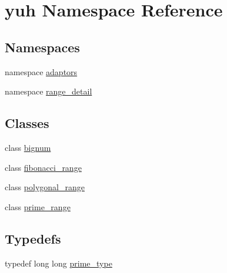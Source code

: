 \hypertarget{namespaceyuh}{\section{yuh \-Namespace \-Reference}
\label{d5/d2b/namespaceyuh}
}
\subsection*{\-Namespaces}
\begin{DoxyCompactItemize}
\item 
namespace \hyperlink{namespaceyuh_1_1adaptors}{adaptors}
\item 
namespace \hyperlink{namespaceyuh_1_1range__detail}{range\-\_\-detail}
\end{DoxyCompactItemize}
\subsection*{\-Classes}
\begin{DoxyCompactItemize}
\item 
class \hyperlink{classyuh_1_1bignum}{bignum}
\item 
class \hyperlink{classyuh_1_1fibonacci__range}{fibonacci\-\_\-range}
\item 
class \hyperlink{classyuh_1_1polygonal__range}{polygonal\-\_\-range}
\item 
class \hyperlink{classyuh_1_1prime__range}{prime\-\_\-range}
\end{DoxyCompactItemize}
\subsection*{\-Typedefs}
\begin{DoxyCompactItemize}
\item 
typedef long long \hyperlink{namespaceyuh_af542f8440602da42322ddb7ea8242336}{prime\-\_\-type}
\end{DoxyCompactItemize}
